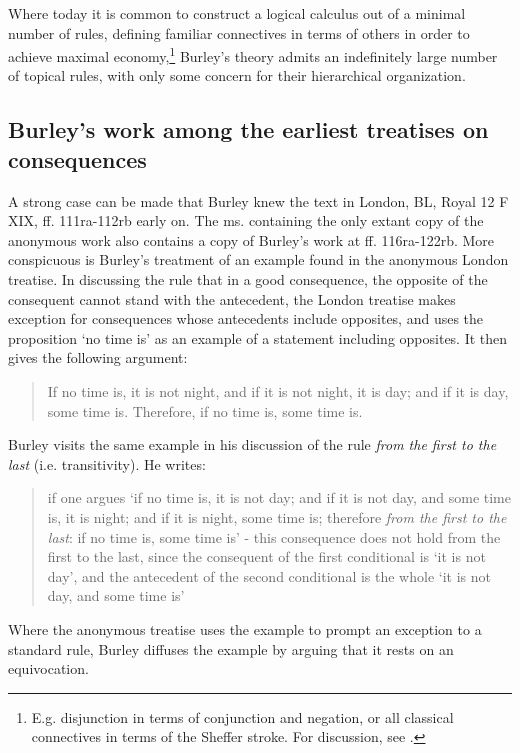 \documentclass[]{birkjour}
\begin{document}
Where today it is common to construct a logical calculus out of a minimal number of rules, defining familiar connectives in terms of others in order to achieve maximal economy,\footnote{E.g. disjunction in terms of conjunction and negation, or all classical connectives in terms of the Sheffer stroke. For discussion, see \autocite{Paseau2016}.} Burley's theory admits an indefinitely large number of topical rules, with only some concern for their hierarchical organization.

\subsection{Burley's work among the earliest treatises on consequences}
A strong case can be made that Burley knew the text in London, BL, Royal 12 F XIX, ff. 111ra-112rb early on. The ms. containing the only extant copy of the anonymous work also contains a copy of Burley's work at ff. 116ra-122rb. More conspicuous is Burley's treatment of an example found in the anonymous London treatise. In discussing the rule that in a good consequence, the opposite of the consequent cannot stand with the antecedent, the London treatise makes exception for consequences whose antecedents include opposites, and uses the proposition `no time is' as an example of a statement including opposites. It then gives the following argument:
\begin{quote}
	If no time is, it is not night, and if it is not night, it is day; and if it is day, some time is. Therefore, if no time is, some time is. \autocite[p. 7, par. 18]{Green-Pedersen1980a}
\end{quote}
Burley visits the same example in his discussion of the rule \textit{from the first to the last} (i.e. transitivity). He writes: 
\begin{quote}
	if one argues `if no time is, it is not day; and if it is not day, and some time is, it is night; and if it is night, some time is; therefore \textit{from the first to the last}: if no time is, some time is' - this consequence does not hold from the first to the last, since the consequent of the first conditional is `it is not day', and the antecedent of the second conditional is the whole `it is not day, and some time is' \autocite[pp. 114-115, par 8]{Green-Pedersen1980b}
\end{quote}
Where the anonymous treatise uses the example to prompt an exception to a standard rule, Burley diffuses the example by arguing that it rests on an equivocation.
\end{document}
